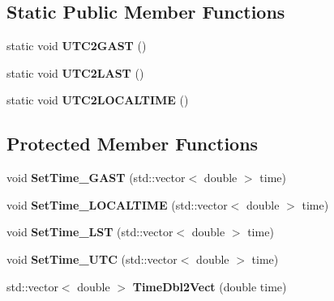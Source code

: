 \subsection*{Static Public Member Functions}
\begin{DoxyCompactItemize}
\item 
\hypertarget{class_c_e_time_a9164c370f3f6517d72b92239f928425c}{}static void {\bfseries U\+T\+C2\+G\+A\+S\+T} ()\label{class_c_e_time_a9164c370f3f6517d72b92239f928425c}

\item 
\hypertarget{class_c_e_time_a0bc67938e50e052053cb50298580ab7d}{}static void {\bfseries U\+T\+C2\+L\+A\+S\+T} ()\label{class_c_e_time_a0bc67938e50e052053cb50298580ab7d}

\item 
\hypertarget{class_c_e_time_aff5450aa7d7347cf5bb20e9a61840a75}{}static void {\bfseries U\+T\+C2\+L\+O\+C\+A\+L\+T\+I\+M\+E} ()\label{class_c_e_time_aff5450aa7d7347cf5bb20e9a61840a75}

\end{DoxyCompactItemize}
\subsection*{Protected Member Functions}
\begin{DoxyCompactItemize}
\item 
\hypertarget{class_c_e_time_a8bb9552b5e5a15624aacb7f64c23c736}{}void {\bfseries Set\+Time\+\_\+\+G\+A\+S\+T} (std\+::vector$<$ double $>$ time)\label{class_c_e_time_a8bb9552b5e5a15624aacb7f64c23c736}

\item 
\hypertarget{class_c_e_time_ac4f727594747d04e58832495c7172045}{}void {\bfseries Set\+Time\+\_\+\+L\+O\+C\+A\+L\+T\+I\+M\+E} (std\+::vector$<$ double $>$ time)\label{class_c_e_time_ac4f727594747d04e58832495c7172045}

\item 
\hypertarget{class_c_e_time_ace112b5a3c97d4b96d891092f3020f9c}{}void {\bfseries Set\+Time\+\_\+\+L\+S\+T} (std\+::vector$<$ double $>$ time)\label{class_c_e_time_ace112b5a3c97d4b96d891092f3020f9c}

\item 
\hypertarget{class_c_e_time_a4875e7ee19b9763c56f4b8f4b867e9ca}{}void {\bfseries Set\+Time\+\_\+\+U\+T\+C} (std\+::vector$<$ double $>$ time)\label{class_c_e_time_a4875e7ee19b9763c56f4b8f4b867e9ca}

\item 
\hypertarget{class_c_e_time_a6653740b539e9ea85d056daa14c654d1}{}std\+::vector$<$ double $>$ {\bfseries Time\+Dbl2\+Vect} (double time)\label{class_c_e_time_a6653740b539e9ea85d056daa14c654d1}

\end{DoxyCompactItemize}
